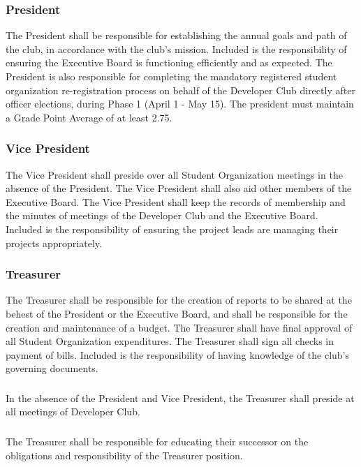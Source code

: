 \documentclass{article}
\newcommand{\clubName}{Developer Club\xspace}
\newcommand{\officersGroup}{Executive Board\xspace}
\newcommand{\meeting}{Student Organization meeting\xspace}
\newcommand{\meetings}{{\meeting}s\xspace}
\let\subsection\subsubsection
\begin{document}
\subsection{President}
The President shall be responsible for establishing the annual goals and path of the club, in accordance with the club's mission. Included is the responsibility of ensuring the \officersGroup is functioning efficiently and as expected. The President is also responsible for completing the mandatory registered student organization re-registration process on behalf of the Developer Club directly after officer elections, during Phase 1 (April 1 - May 15). The president must maintain a Grade Point Average of at least 2.75.

\subsection{Vice President}
The Vice President shall preside over all \meetings in the absence of the President. The Vice President shall also aid other members of the \officersGroup. The Vice President shall keep the records of membership and the minutes of meetings of the \clubName and the \officersGroup. Included is the responsibility of ensuring the project leads are managing their projects appropriately. 

\subsection{Treasurer} 
The Treasurer shall be responsible for the creation of reports to be shared at the behest of the President or the \officersGroup, and shall be responsible for the creation and maintenance of a budget. The Treasurer shall have final approval of all Student Organization expenditures. The Treasurer shall sign all checks in payment of bills. Included is the responsibility of having knowledge of the club's governing documents.

\subsubsection{} In the absence of the President and Vice President, the Treasurer shall preside at all meetings of \clubName.
\subsubsection{} The Treasurer shall be responsible for educating their successor on the obligations and responsibility of the Treasurer position.
\end{document}
